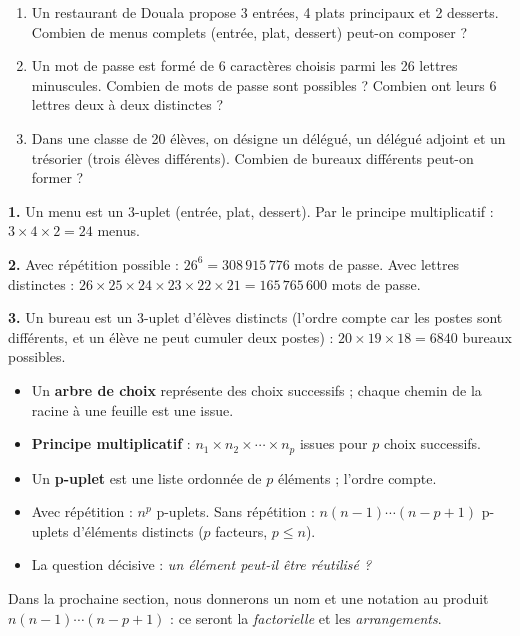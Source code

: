 \documentclass[11pt]{article}
\begin{document}
\begin{exercice}
\begin{enumerate}
\item Un restaurant de Douala propose 3 entrées, 4 plats principaux et 2 desserts. Combien de menus complets (entrée, plat, dessert) peut-on composer ?
\item Un mot de passe est formé de 6 caractères choisis parmi les 26 lettres minuscules. Combien de mots de passe sont possibles ? Combien ont leurs 6 lettres deux à deux distinctes ?
\item Dans une classe de 20 élèves, on désigne un délégué, un délégué adjoint et un trésorier (trois élèves différents). Combien de bureaux différents peut-on former ?
\end{enumerate}
\end{exercice}

\begin{corrige}
\textbf{1.} Un menu est un 3-uplet (entrée, plat, dessert). Par le principe multiplicatif : $3 \times 4 \times 2 = 24$ menus.

\textbf{2.} Avec répétition possible : $26^6 = 308\,915\,776$ mots de passe. Avec lettres distinctes : $26 \times 25 \times 24 \times 23 \times 22 \times 21 = 165\,765\,600$ mots de passe.

\textbf{3.} Un bureau est un 3-uplet d'élèves distincts (l'ordre compte car les postes sont différents, et un élève ne peut cumuler deux postes) : $20 \times 19 \times 18 = 6840$ bureaux possibles.
\end{corrige}

\begin{aretenir}
\begin{itemize}
\item Un \textbf{arbre de choix} représente des choix successifs ; chaque chemin de la racine à une feuille est une issue.
\item \textbf{Principe multiplicatif} : $n_1 \times n_2 \times \cdots \times n_p$ issues pour $p$ choix successifs.
\item Un \textbf{p-uplet} est une liste ordonnée de $p$ éléments ; l'ordre compte.
\item Avec répétition : $n^p$ p-uplets. Sans répétition : $n(n-1)\cdots(n-p+1)$ p-uplets d'éléments distincts ($p$ facteurs, $p \leq n$).
\item La question décisive : \emph{un élément peut-il être réutilisé ?}
\end{itemize}
Dans la prochaine section, nous donnerons un nom et une notation au produit $n(n-1)\cdots(n-p+1)$ : ce seront la \emph{factorielle} et les \emph{arrangements}.
\end{aretenir}
\end{document}
